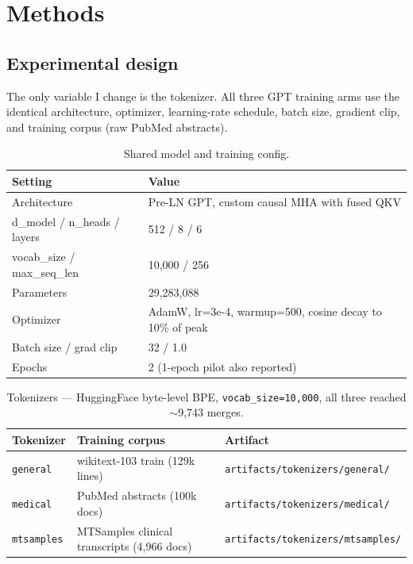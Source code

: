 \documentclass[11pt]{article}
\begin{document}
\section{Methods}

\subsection{Experimental design}

The only variable I change is the tokenizer. All three GPT training arms use the identical architecture, optimizer, learning-rate schedule, batch size, gradient clip, and training corpus (raw PubMed abstracts).

\begin{table}[H]
\centering
\caption{Shared model and training config.}
\begin{tabular}{ll}
\toprule
Setting & Value \\
\midrule
Architecture & Pre-LN GPT, custom causal MHA with fused QKV \\
d\_model / n\_heads / layers & 512 / 8 / 6 \\
vocab\_size / max\_seq\_len & 10,000 / 256 \\
Parameters & 29,283,088 \\
Optimizer & AdamW, lr=3e-4, warmup=500, cosine decay to 10\% of peak \\
Batch size / grad clip & 32 / 1.0 \\
Epochs & 2 (1-epoch pilot also reported) \\
\bottomrule
\end{tabular}
\end{table}

\begin{table}[H]
\centering
\caption{Tokenizers --- HuggingFace byte-level BPE, \texttt{vocab\_size=10{,}000}, all three reached $\sim$9,743 merges.}
\begin{tabular}{lll}
\toprule
Tokenizer & Training corpus & Artifact \\
\midrule
\texttt{general}   & wikitext-103 train (129k lines)            & \texttt{artifacts/tokenizers/general/} \\
\texttt{medical}   & PubMed abstracts (100k docs)               & \texttt{artifacts/tokenizers/medical/} \\
\texttt{mtsamples} & MTSamples clinical transcripts (4,966 docs)\footnotemark & \texttt{artifacts/tokenizers/mtsamples/} \\
\bottomrule
\end{tabular}
\end{table}
\end{document}
